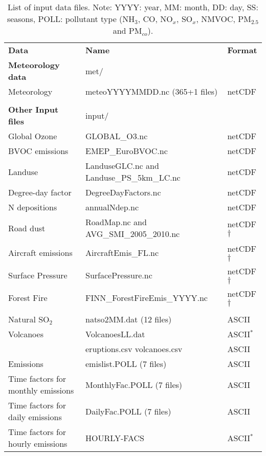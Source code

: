 \begin{table}
\caption[List of input data files]{List of input data files.
Note: YYYY: year, MM: month, DD: day, SS: seasons, POLL: pollutant
type (NH$_3$, CO, NO$_x$, SO$_x$, NMVOC,
PM$_{2.5}$ and PM$_{co}$). 
\label{Tab:inputdata}}
\begin{center}
\begin{small}
\begin{tabular}{lll}
\hline
{\bf Data} &  {\bf Name} & {\bf Format}\\
{\bf Meteorology data} & met/&  \\
Meteorology  &  meteoYYYYMMDD.nc \quad (365+1 files) & netCDF\\
& & \\
{\bf Other Input files} & input/ &\\
Global Ozone & GLOBAL\_O3.nc & netCDF\\
BVOC emissions & EMEP\_EuroBVOC.nc & netCDF\\
Landuse & LanduseGLC.nc and Landuse\_PS\_5km\_LC.nc  & netCDF\\
Degree-day factor & DegreeDayFactors.nc &  netCDF\\
N depositions & annualNdep.nc  & netCDF\\
Road dust &  RoadMap.nc and AVG\_SMI\_2005\_2010.nc& netCDF$\dagger$ \\
Aircraft emissions & AircraftEmis\_FL.nc & netCDF$\dagger$ \\
Surface Pressure & SurfacePressure.nc & netCDF$\dagger$ \\
Forest Fire & FINN\_ForestFireEmis\_YYYY.nc & netCDF$\dagger$ \\
& & \\
Natural SO$_2$ & natso2MM.dat  \quad (12 files) & ASCII\\
Volcanoes & VolcanoesLL.dat & ASCII$^*$\\
	  & eruptions.csv volcanoes.csv& ASCII \\ 
Emissions & emislist.POLL  \quad (7 files) & ASCII\\
Time factors for monthly emissions& MonthlyFac.POLL  \quad (7 files) & ASCII\\
Time factors for daily emissions &  DailyFac.POLL  \quad (7 files) & ASCII\\
Time factors for hourly emissions & HOURLY-FACS  & ASCII$^*$\\

\end{tabular}
\end{small}
\end{center}
\end{table}
